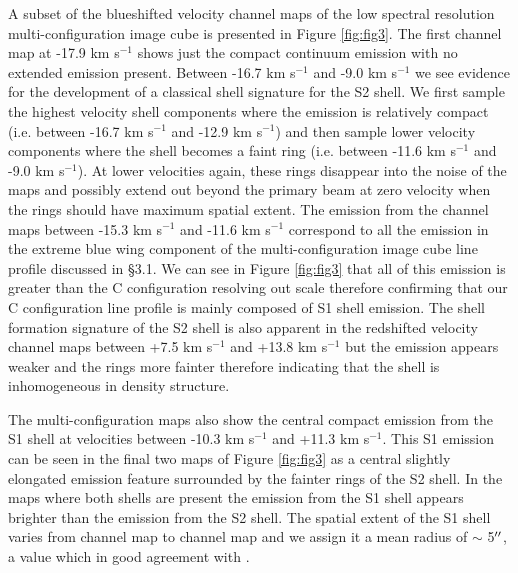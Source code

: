 \documentclass[apj]{emulateapj}
\begin{document}
A subset of the blueshifted velocity channel maps of the low spectral resolution multi-configuration image cube is presented in Figure \ref{fig:fig3}. The first channel map at -17.9 km s${}^{-1}$ shows just the compact continuum emission with no extended emission present. Between -16.7 km s${}^{-1}$ and -9.0 km s${}^{-1}$ we see evidence for the development of a classical shell signature for the S2 shell. We first sample the highest velocity shell components where the emission is relatively compact (i.e. between -16.7 km s${}^{-1}$ and -12.9 km s${}^{-1}$) and then sample lower velocity components where the shell becomes a faint ring (i.e. between -11.6 km s${}^{-1}$ and -9.0 km s${}^{-1}$). At lower velocities again, these rings disappear into the noise of the maps and possibly extend out beyond the primary beam at zero velocity when the rings should have maximum spatial extent. The emission from the channel maps between -15.3 km s${}^{-1}$ and -11.6 km s${}^{-1}$ correspond to all the emission in the extreme blue wing component of the multi-configuration image cube line profile discussed in \S3.1. We can see in Figure \ref{fig:fig3} that all of this emission is greater than the C configuration resolving out scale therefore confirming that our C configuration line profile is mainly composed of S1 shell emission. The shell formation signature of the S2 shell is also apparent in the redshifted velocity channel maps between +7.5 km s${}^{-1}$ and +13.8 km s${}^{-1}$ but the emission appears weaker and the rings more fainter therefore indicating that the shell is inhomogeneous in density structure. 

The multi-configuration maps also show the central compact emission from the S1 shell at velocities between -10.3 km s${}^{-1}$ and +11.3 km s${}^{-1}$. This S1 emission can be seen in the final two maps of Figure \ref{fig:fig3} as a central slightly elongated emission feature surrounded by the fainter rings of the S2 shell. In the maps where both shells are present the emission from the S1 shell appears brighter than the emission from the S2 shell. The spatial extent of the S1 shell varies from channel map to channel map and we assign it a mean radius of $\sim$ 5$\mbox{$^{\prime\prime}$}$, a value which in good agreement with \cite{2009AJ....137.3558S}. 
\end{document}
